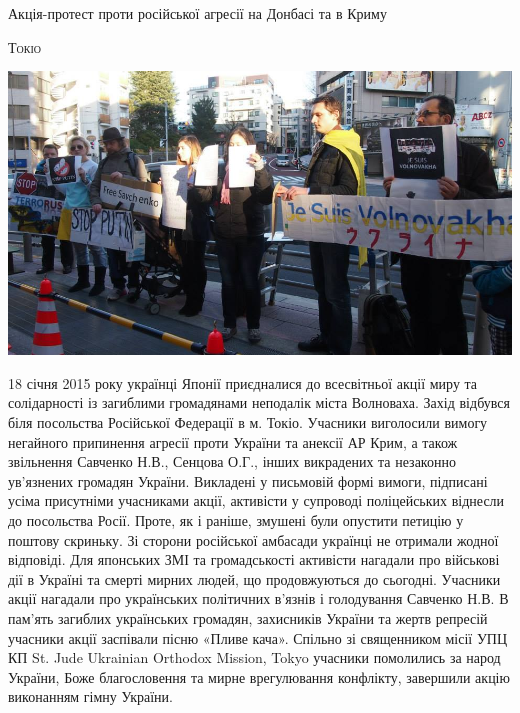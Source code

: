 \documentclass[10pt,a4paper]{article}
\newcommand{\NewsItem}[1]{%
		\usefont{T2A}{iwona}{m}{n} 
		\large #1 \vspace{4pt}
		\par \normalsize \normalfont}
\newcommand{\NewsAuthor}[1]{%
			\hfill \textsc{#1} \vspace{4pt}
			\par \normalfont}
\begin{document}
\begin{multicols}{3}
\vspace{1cm}
\NewsItem{Акція-протест проти російської агресії на Донбасі та в Криму}
\NewsAuthor{Токіо}
		\begin{center}
			\includegraphics[width=0.8\linewidth]{images/protest}
		\end{center}
18 січня 2015 року українці Японії приєдналися до всесвітньої акції миру та солідарності із загиблими громадянами неподалік міста Волноваха. Захід відбувся біля посольства Російської Федерації в м. Токіо.
Учасники виголосили вимогу негайного припинення агресії проти України та анексії АР Крим, а також звільнення Савченко Н.В., Сенцова О.Г., інших викрадених та незаконно ув’язнених громадян України. Викладені у письмовій формі вимоги, підписані усіма присутніми учасниками акції, активісти у супроводі поліцейських віднесли до посольства Росії. Проте, як і раніше, змушені були опустити петицію у поштову скриньку. Зі сторони російської амбасади українці не отримали жодної відповіді.
Для японських ЗМІ та громадськості активісти нагадали про військові дії в Україні та смерті мирних людей, що продовжуються до сьогодні. Учасники акції нагадали про українських політичних в’язнів і голодування Савченко Н.В.
В пам’ять загиблих українських громадян, захисників України та жертв репресій учасники акції заспівали пісню «Пливе кача».
Спільно зі священником місії УПЦ КП St. Jude Ukrainian Orthodox Mission, Tokyo учасники помолились за народ України, Боже благословення та мирне врегулювання конфлікту, завершили акцію виконанням гімну України.


\end{multicols}
\end{document}
